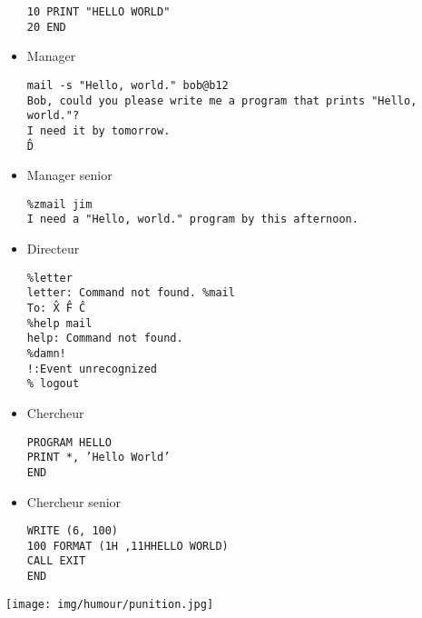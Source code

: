 \begin{itemize}
\texttt{10 PRINT "HELLO WORLD"\\
20 END}

	\item Manager

\texttt{mail -s "Hello, world." bob@b12\\
Bob, could you please write me a program that prints "Hello, world."?\\
I need it by tomorrow.\\
\^D\\}

	\item Manager senior

\texttt{\%zmail jim\\
I need a "Hello, world." program by this afternoon.}

	\item Directeur

\texttt{\%letter\\
letter: Command not found.
\%mail\\
To: \^X \^F \^C\\
\%help mail\\
help: Command not found.\\
\%damn!\\
!:Event unrecognized\\
\% logout\\}

	\item Chercheur

\texttt{PROGRAM HELLO\\
PRINT *, 'Hello World'\\
END}

	\item Chercheur senior

\texttt{WRITE (6, 100)\\
100 FORMAT (1H ,11HHELLO WORLD)\\
CALL EXIT\\
END}

\end{itemize}

\begin{center}\underline{\hspace{5 cm}}\end{center}	

	\begin{center}
	\texttt{[image: img/humour/punition.jpg]}
	\end{center}
	
\begin{center}\underline{\hspace{5 cm}}\end{center}

